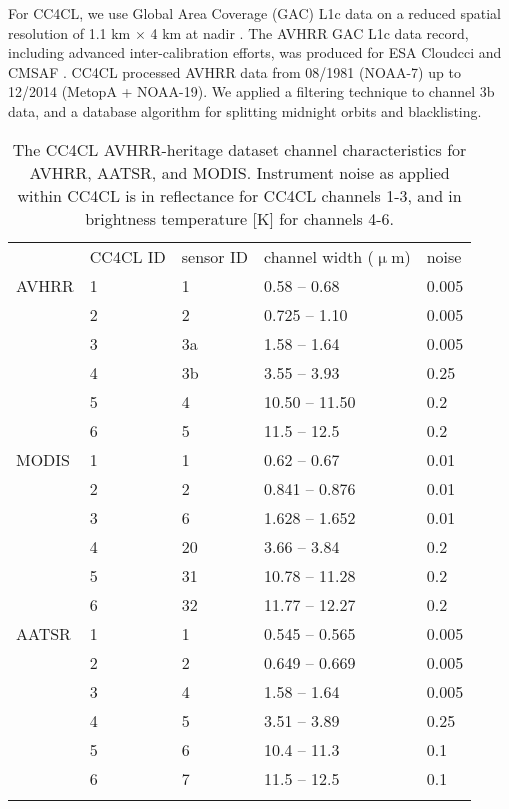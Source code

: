 For CC4CL, we use Global Area Coverage (GAC) L1c data on a reduced spatial resolution of 1.1 km $\times$ 4 km at nadir \citep{Devasthale16}. The AVHRR GAC L1c data record, including advanced inter-calibration efforts, was produced for ESA Cloud\textunderscore cci and CMSAF \citep{Schulz09,Karlsson13}. CC4CL processed AVHRR data from 08/1981 (NOAA-7) up to 12/2014 (MetopA + NOAA-19). We applied a filtering technique to channel 3b data, and a database algorithm for splitting midnight orbits and blacklisting. 

\begin{table}[h]
  \caption{The CC4CL AVHRR-heritage dataset channel characteristics for AVHRR, AATSR, and MODIS. Instrument noise as applied within CC4CL is in reflectance for CC4CL channels 1-3, and in brightness temperature [K] for channels 4-6.}
  \begin{tabular}{l|p{0.7cm}p{0.7cm}p{1.8cm}p{0.5cm}}
    \tophline
    & CC4CL ID & sensor ID & channel width ($\upmu$m) & noise \\
    \middlehline
    AVHRR & 1 & 1 & 0.58 -- 0.68 & 0.005 \\
          & 2 & 2 & 0.725 -- 1.10 & 0.005 \\
          & 3 & 3a & 1.58 -- 1.64 & 0.005 \\
          & 4 & 3b & 3.55 -- 3.93 & 0.25 \\
          & 5 & 4 & 10.50 -- 11.50 & 0.2 \\
          & 6 & 5 & 11.5 -- 12.5 & 0.2 \\
    \middlehline
    MODIS & 1 & 1 & 0.62 -- 0.67 & 0.01 \\
          & 2 & 2 & 0.841 -- 0.876 & 0.01 \\
          & 3 & 6 & 1.628 -- 1.652 & 0.01 \\
          & 4 & 20 & 3.66 -- 3.84 & 0.2 \\
          & 5 & 31 & 10.78 -- 11.28 & 0.2 \\
          & 6 & 32 & 11.77 -- 12.27 & 0.2 \\
    \middlehline
    AATSR & 1 & 1 & 0.545 -- 0.565 & 0.005 \\
          & 2 & 2 & 0.649 -- 0.669 & 0.005 \\
          & 3 & 4 & 1.58 -- 1.64 & 0.005 \\
          & 4 & 5 & 3.51 -- 3.89 & 0.25 \\
          & 5 & 6 & 10.4 -- 11.3 & 0.1 \\
          & 6 & 7 & 11.5 -- 12.5 & 0.1 \\
    \bottomhline
  \end{tabular}
  \label{tab:channels}
\end{table}

